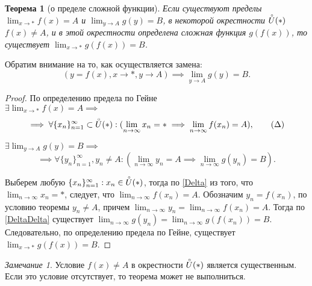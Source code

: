 \documentclass[a4paper,12pt]{article} %
\newtheorem{theorem}{Теорема}[section]
\theoremstyle{remark}
\newtheorem*{remark}{Замечание}
\theoremstyle{definition}
\begin{document}
\begin{theorem}[о пределе сложной функции]
	Если существуют пределы $\lim_{x \to *} f(x) = A$ и $\lim_{y \to A} g(y) = B$, в некоторой окрестности $\accentset{\circ}{U}(*)$ $f(x)\neq A$, и в этой окрестности определена сложная функция $g(f(x))$, то существует $\lim_{x \to *} g(f(x)) = B$.
\end{theorem}
Обратим внимание на то, как осуществляется замена:
\[
	(y=f(x), x\to *, y \to A) \implies \lim_{y \to A} g(y) = B
.\] 
\begin{proof}
	По определению предела по Гейне \\
	
	$\displaystyle \exists \lim_{x \to *} f(x) = A \implies $
	\begin{equation}\label{Delta}
			\implies \forall \{x_n\}_{n=1}^{\infty} \subset \accentset{\circ}{U}(*) : (\lim_{n \to \infty} x_n = * \implies \lim_{n \to \infty} f(x_n) = A), \tag{$\Delta$} 
	\end{equation}

	$\displaystyle \exists \lim_{y \to A} g(y) = B \implies$
	\begin{equation}\label{DeltaDelta}
			 \implies \forall \{y_n\}_{n=1}^{\infty}, y_{n}\neq A : (\lim_{n \to \infty} y_n = A \implies \lim_{n \to \infty} g(y_{n}) = B). \tag{$\Delta\Delta$} 
	\end{equation}

	Выберем любую $\{x_n\}_{n=1}^{\infty} : x_{n} \in  \accentset{\circ}{U}(*)$, тогда по \eqref{Delta} из того, что $\lim_{n \to \infty} x_n = *$, следует, что $\lim_{n \to \infty} f(x_{n}) = A$. Обозначим $y_{n}=f(x_{n})$, по условию теоремы $y_{n}\neq A$, причем $\lim_{n \to \infty} y_{n} = \lim_{n \to \infty} f(x_{n}) = A$. Тогда по \eqref{DeltaDelta} существует $\lim_{n \to \infty} g(y_{n}) = \lim_{n \to \infty} g(f(x_{n})) = B$. Следовательно, по определению предела по Гейне, существует $\lim_{x \to *} g(f(x)) = B$.
\end{proof}
\begin{remark}
	Условие $f(x)\neq A$ в окрестности $\accentset{\circ}{U}(*)$ является существенным. Если это условие отсутствует, то теорема может не выполниться.
\end{remark}
\end{document}
